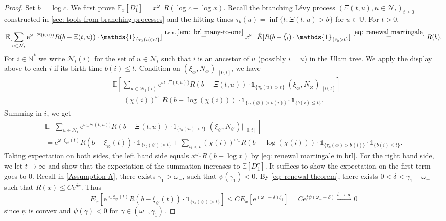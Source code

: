 \documentclass[12pt]{article}
\numberwithin{equation}{section}
\theoremstyle{plain}
\theoremstyle{definition}
\begin{document}
\begin{proof}
Set $b = \log c$. We first prove $\mathbb{E}_x\left[D^c_1\right] = x^{\omega_-}R(\log c-\log x)$. Recall the branching L\'evy process $(\Xi(t,u), u\in\mathcal{N}_t)_{t\geq 0}$ constructed in \cref{sec: tools from branching processes} and  the hitting times $\tau_b(u) = \inf\{t: \Xi(t,u) > b\}$ for $u \in \mathbb{U}$. For $t>0$,
\begin{equation}\label{eq: renewal martingale in brl}
\mathbb{E}[\sum_{u\in \mathcal{N}_t} \mathrm{e}^{\omega_-\Xi(t,u))}R(b - \Xi(t,u)) \cdot \mathds{1}_{\{\tau_b(u) > t\}} ] \stackrel{\mathrm{Lem. }\ref{lem: brl many-to-one}}{=} x^{\omega_-}\hat{E}[R(b - \hat{\xi}_t) \cdot \mathds{1}_{\{\hat{\tau}_b > t\}}] \stackrel{\eqref{eq: renewal martingale}}{=} R(b).
\end{equation}
\noindent For $i\in\mathbb{N}^*$ we write $\mathcal{N}_t(i)$ for the set of $u\in\mathcal{N}_t$ such that $i$ is an ancestor of $u$ (possibly $i=u$) in the Ulam tree. We apply the display above to each $i$ if its birth time $b(i)\leq t$. Condition on $(\xi_{\varnothing}, N_{\varnothing})|_{[0, t]}$, we have
\begin{align*}
&\mathbb{E}\left[\sum_{u\in \mathcal{N}_t(i)} \mathrm{e}^{\omega_-\Xi(t,u))}R(b - \Xi(t,u)) \cdot \mathds{1}_{\{\tau_b(u) > t\}} \Big | (\xi_{\varnothing}, N_{\varnothing})|_{[0, t]}\right] \\
&\,=(\chi(i))^{\omega_-}R(b - \log(\chi(i)))\cdot \mathds{1}_{\{\tau_b(\varnothing)>b(i)\}} \cdot \mathds{1}_{\{b(i)\leq t\}}.
\end{align*}
Summing in $i$, we get
\begin{multline*}
\mathbb{E}\left[\sum_{u\in \mathcal{N}_t} \mathrm{e}^{\omega_-\Xi(t,u))}R(b - \Xi(t,u)) \cdot 1_{\{\tau_b(u) > t\}}  \Big | (\xi_{\varnothing}, N_{\varnothing})|_{[0, t]}\right]\\
= \mathrm{e}^{\omega_-\xi_{\varnothing}(t)}R(b -\xi_{\varnothing}(t))\cdot \mathds{1}_{\{\tau_b(\varnothing)>t\}} + \sum_{t_i < t} (\chi(i))^{\omega_-}R(b - \log(\chi(i)))\cdot \mathds{1}_{\{\tau_b(\varnothing)>b(i)\}}\cdot \mathds{1}_{\{b(i)\leq t\}}.
\end{multline*}
\noindent Taking expectation on both sides, the left hand side equals $x^{\omega_-}R(b-\log x)$ by \eqref{eq: renewal martingale in brl}. For the right hand side, we let $t\to\infty$ and show that the expectation of the summation increases to $\mathbb{E}[D_1^c]$. It suffices to show the expectation on the first term goes to $0$. Recall in \cref{Assumption A}, there exists $\gamma_1 > \omega_-$, such that $\psi(\gamma_1)<0$. By \eqref{eq: renewal theorem}, there exists $0<\delta<\gamma_1-\omega_-$ such that $R(x)\leq C \mathrm{e}^{\delta x}$. Thus
\[
E_x[\mathrm{e}^{\omega_-\xi_{\varnothing}(t)}R(b -\xi_{\varnothing}(t))\cdot \mathds{1}_{\{\tau_b(\varnothing)>t\}}] \leq CE_x[\mathrm{e}^{(\omega_- + \delta)\xi_{t}}] = C\mathrm{e}^{t\psi(\omega_- + \delta)} \xrightarrow[]{t\to\infty} 0
\]
\noindent since $\psi$ is convex and $\psi(\gamma)<0$ for $\gamma\in(\omega_-, \gamma_1)$.


\end{proof}
\end{document}
